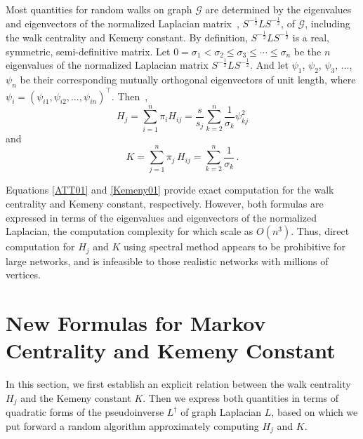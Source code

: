 \documentclass[sigconf]{acmart}
\def\calG{\mathcal{G}}
\newcommand\ppsi{\boldsymbol{\mathit{\psi}}}
\newcommand\LL{\boldsymbol{\mathit{L}}}
\renewcommand\SS{\boldsymbol{\mathit{S}}}
\begin{document}
Most quantities for random walks on graph $\calG$ are determined by the eigenvalues and eigenvectors of the normalized Laplacian matrix~\cite{Ch97}, ${\SS}^{-\frac{1}{2}}\LL {\SS}^{-\frac{1}{2}}$, of $\calG$, including the walk centrality and Kemeny constant. By definition, ${\SS}^{-\frac{1}{2}}\LL {\SS}^{-\frac{1}{2}}$ is a real, symmetric, semi-definitive matrix. Let $0=\sigma_1 < \sigma_2 \leq \sigma_3 \leq \cdots \leq \sigma_n $ be the $n$ eigenvalues of the normalized Laplacian matrix ${\SS}^{-\frac{1}{2}}\LL {\SS}^{-\frac{1}{2}}$. And let $\ppsi_1$, $\ppsi_2$, $\ppsi_3$, $\ldots$, $\ppsi_n$ be their corresponding mutually orthogonal eigenvectors of unit length, where $\ppsi_i=(\psi_{i1},\psi_{i2},\ldots,\psi_{in})^{\top}$. Then~\cite{Lo93,Be16},
\begin{equation}\label{ATT01}
	H_j=\sum_{i=1}^{n} \pi_i H_{ij}=\frac{s}{s_j}\sum_{k=2}^{n}\frac{1}{\sigma_{k}}\psi_{kj}^{2}
\end{equation}
and
\begin{equation}\label{Kemeny01}
	K =\sum_{j=1}^{n}\pi_j\,H_{ij} =\sum_{k=2}^{n}\frac{1}{\sigma_{k}}\,.
\end{equation}

Equations \eqref{ATT01} and \eqref{Kemeny01} provide exact computation for the walk centrality and Kemeny constant, respectively. However, both formulas are expressed in terms of  the eigenvalues and eigenvectors of the normalized Laplacian, the computation complexity for which scale as $O(n^3)$. Thus, direct  computation for $H_j$ and $K$  using spectral method appears to be prohibitive for large networks, and is  infeasible  to those realistic networks with millions of vertices.



\section{New Formulas for Markov  Centrality and Kemeny Constant }

In this section, we first establish an explicit relation between the walk centrality $H_j$ and the Kemeny constant $K$.  Then we express both quantities in terms of quadratic forms of the pseudoinverse $\LL^{\dagger}$  of graph Laplacian $\LL$, based on which we put forward a random  algorithm  approximately computing $H_j$ and  $K$.

\end{document}
